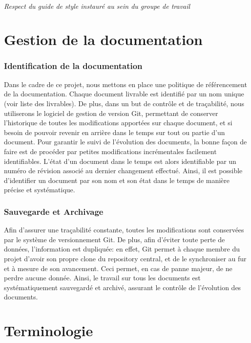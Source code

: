 \documentclass[a4paper, 18pt]{article}
\begin{document}
\paragraph*{Respect du guide de style instauré au sein du groupe de travail}

\part{Gestion de la documentation}

\section{Identification de la documentation}

Dans le cadre de ce projet, nous mettons en place une politique de référencement de la documentation. Chaque document livrable est identifié par un nom unique (voir liste des livrables). De plus, dans un but de contrôle et de traçabilité, nous utiliserons le logiciel de gestion de version Git, permettant de conserver l'historique de toutes les modifications apportées sur chaque document, et si besoin de pouvoir revenir en arrière dans le temps sur tout ou partie d'un document. Pour garantir le suivi de l'évolution des documents, la bonne façon de faire est de procéder par petites modifications incrémentales facilement identifiables. L'état d'un document dans le temps est alors identifiable par un numéro de révision associé au dernier changement effectué. Ainsi, il est possible d'identifier un document par son nom et son état dans le temps de manière précise et systématique.

\section{Sauvegarde et Archivage}

Afin d'assurer une traçabilité constante, toutes les modifications sont conservées par le système de versionnement Git. De plus, afin d'éviter toute perte de données, l'information est dupliquée: en effet, Git permet à chaque membre du projet d'avoir son propre clone du repository central, et de le synchroniser au fur et à mesure de son avancement. Ceci permet, en cas de panne majeur, de ne perdre aucune donnée. Ainsi, le travail sur tous les documents est systématiquement sauvegardé et archivé, assurant le contrôle de l'évolution des documents.

\part{Terminologie}
\end{document}
